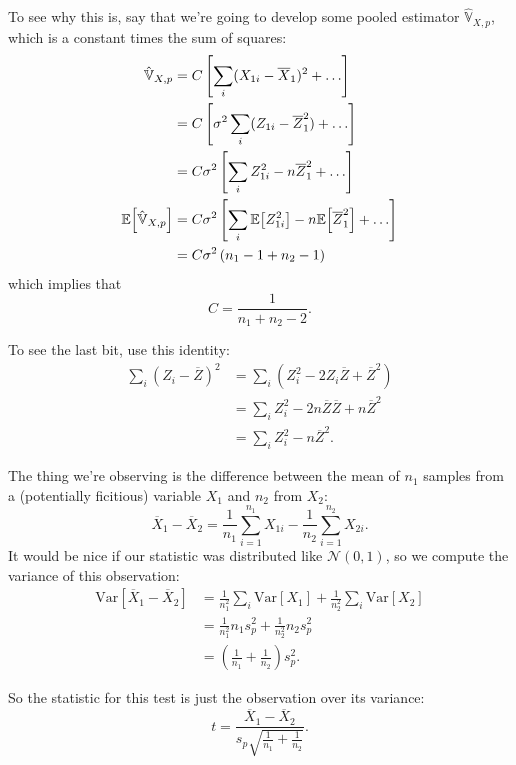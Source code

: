 To see why this is, say that we're going to develop some pooled estimator
$\hat{\mathbb{V}}_{X,p}$, which is a constant times the sum of squares:
\begin{align}
\hat{\mathbb{V}}_{X,p} &= C \left[ \sum_i (X_{1i} - \overline{X}_1)^2 + \ldots \right] \\
  &= C \left[ \sigma^2 \sum_i (Z_{1i} - \overline{Z}_1^2 ) + \ldots \right] \\
  &= C \sigma^2 \left[ \sum_i Z_{1i}^2 - n \overline{Z}_1^2 + \ldots \right] \\
\mathbb{E}\!\left[{\hat{\mathbb{V}}_{X,p}}\right] &= C \sigma^2 \left[ \sum_i \mathbb{E}\!\left[{Z_{1i}^2}\right] - n \mathbb{E}\!\left[{\overline{Z}_1^2}\right] + \ldots \right] \\
  &= C \sigma^2 \left( n_1 - 1 + n_2 - 1 \right) \\
\end{align}
which implies that
\begin{equation}
C = \frac{1}{n_1 + n_2 - 2}.
\end{equation}

To see the last bit, use this identity:
\begin{align}
\sum_i (Z_i - \overline{Z})^2 &= \sum_i (Z_i^2 - 2 Z_i \overline{Z} + \overline{Z}^2) \\
  &= \sum_i Z_i^2 - 2 n \overline{Z} \overline{Z} + n \overline{Z}^2 \\
  &= \sum_i Z_i^2 - n \overline{Z}^2.
\end{align}

The thing we're observing is the difference between the mean of \(n_1\)
samples from a (potentially ficitious) variable \(X_1\) and \(n_2\) from
\(X_2\): \[
\overline{X}_1 - \overline{X}_2 = \frac{1}{n_1} \sum_{i=1}^{n_1} X_{1i} - \frac{1}{n_2} \sum_{i=1}^{n_2} X_{2i}.
\] It would be nice if our statistic was distributed like
\(\mathcal{N}(0, 1)\), so we compute the variance of this observation:
\[
\begin{aligned}
\mathrm{Var}\left[ \overline{X}_1 - \overline{X}_2 \right]
  &= \frac{1}{n_1^2} \sum_i \mathrm{Var}[X_1] + \frac{1}{n_2^2} \sum_i \mathrm{Var}[X_2] \\
  &= \frac{1}{n_1^2} n_1 s_p^2 + \frac{1}{n_2^2} n_2 s_p^2 \\
  &= \left( \frac{1}{n_1} + \frac{1}{n_2} \right) s_p^2.
\end{aligned}
\]

So the statistic for this test is just the observation over its
variance: \[
t = \frac{\overline{X}_1 - \overline{X}_2}{s_p \sqrt{\frac{1}{n_1} + \frac{1}{n_2}}}.
\]

